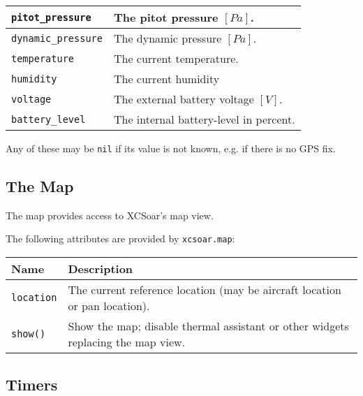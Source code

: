 \begin{maxipage}
\begin{tabular}{l|p{12cm}}
\verb|pitot_pressure| & The pitot pressure
$[{Pa}]$. \\

\hline

\verb|dynamic_pressure| & The dynamic pressure
$[{Pa}]$. \\

\hline

\verb|temperature| & The current temperature. \\

\hline

\verb|humidity| & The current humidity \\

\hline

\verb|voltage| & The external battery voltage
$[{V}]$. \\

\hline

\verb|battery_level| & The internal battery-level in percent.

\end{tabular}
\end{maxipage}

Any of these may be \verb|nil| if its value is not known, e.g. if
there is no GPS fix.

\subsection{The Map}

The map provides access to XCSoar's map view.

The following attributes are provided by \verb|xcsoar.map|:

\begin{maxipage}
\begin{tabular}{l|p{12cm}}
Name & Description \\
\hline\hline

\verb|location| & The current reference location (may be aircraft location or
pan location). \\

\hline

\verb|show()| & Show the map; disable thermal assistant or other
widgets replacing the map view. \\

\end{tabular}
\end{maxipage}

\subsection{Timers}

